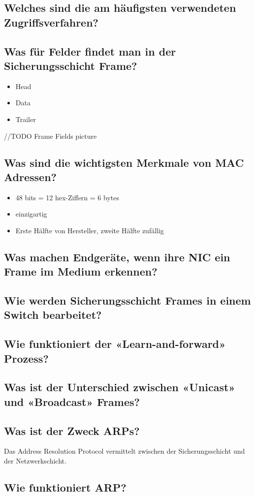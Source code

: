\subsection*{Welches sind die am häufigsten verwendeten Zugriffsverfahren?}
\subsection*{Was für Felder findet man in der Sicherungsschicht Frame?}
\begin{itemize}
    \item Head
    \item Data
    \item Trailer
\end{itemize}
//TODO Frame Fields picture
\subsection*{Was sind die wichtigsten Merkmale von MAC Adressen?}
\begin{itemize}
    \item 48 bits = 12 hex-Ziffern = 6 bytes
    \item einzigartig
    \item Erste Hälfte von Hersteller, zweite Hälfte zufällig
\end{itemize}
\subsection*{Was machen Endgeräte, wenn ihre NIC ein Frame im Medium erkennen?}
\subsection*{Wie werden Sicherungsschicht Frames in einem Switch bearbeitet? }

\subsection*{Wie funktioniert der «Learn-and-forward» Prozess?}
\subsection*{Was ist der Unterschied zwischen «Unicast» und «Broadcast» Frames?}
\subsection*{Was ist der Zweck ARPs?}
Das Address Resolution Protocol vermittelt zwischen der Sicherungsschicht und der Netzwerkschicht.
\subsection*{Wie funktioniert ARP?}
